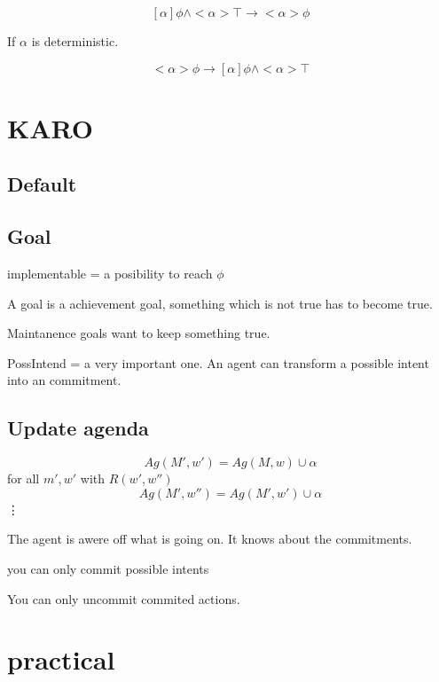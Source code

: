 \documentclass{article}
\begin{document}
\[[\alpha]\phi \wedge <\alpha>\top\to <\alpha>\phi\]

If $\alpha$ is deterministic.

\[ <\alpha>\phi \to [\alpha]\phi \wedge <\alpha>\top\]

\section{KARO}
\subsection{Default}

\subsection{Goal}
implementable = a posibility to reach $\phi$

A goal is a achievement goal, something which is not true
has to become true.

Maintanence goals want to keep something true.

PossIntend = a very important one. An agent can
transform a possible intent into an commitment.

\subsection{Update agenda}
\[Ag(M',w') = Ag(M,w)\cup\alpha\]
for all $m',w'$ with $R(w',w'')$ 
\[Ag(M',w'') = Ag(M',w')\cup\alpha\]
\vdots

The agent is awere off what is going on. It knows
about the commitments.

you can only commit possible intents

You can only uncommit commited actions.

\section{practical}
\begin{prooftree}
\end{prooftree}
\end{document}
